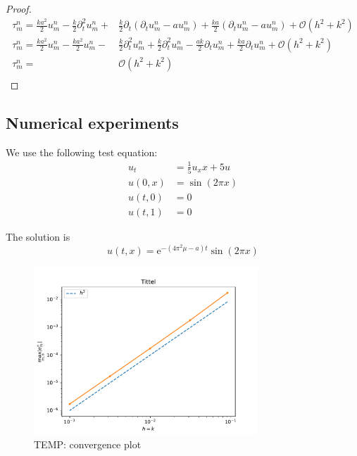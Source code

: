 \begin{proof}
    \begin{align*}
        \tau_m^n = \frac{ka^2}{2}u_{m}^{n}  - \frac{k}{2} \partial_t^2 u_{m}^{n} +& \frac{k}{2} \partial_t \left(\partial_t u_{m}^{n}   - au_{m}^{n} \right) + \frac{ka}{2} \left( \partial_t  u_{m}^{n} - a u_{m}^{n}\right)+ \mathcal{O}(h^2 + k^2) \\
        \tau_m^n = \frac{ka^2}{2}u_{m}^{n} - \frac{ka^2}{2}u_{m}^{n}  -& \frac{k}{2} \partial_t^2 u_{m}^{n} + \frac{k}{2} \partial_t^2 u_{m}^{n} - \frac{ak}{2} \partial_t u_{m}^{n} + \frac{ka}{2} \partial_t  u_{m}^{n}+ \mathcal{O}(h^2 + k^2) \\
        \tau_m^n =& \mathcal{O}(h^2 + k^2) \\
    \end{align*}
\end{proof}

\subsection{Numerical experiments}

We use the following test equation:
\begin{align}
  u_t &= \frac{1}{5}u_xx + 5 u \\
  u(0, x) &= \sin (2\pi x) \\
  u(t, 0) &= 0 \\
  u(t, 1) &= 0
\end{align}

The solution is
\begin{equation}
  \label{eq:anal_sol}
  u(t, x) = \text{e}^{-(4\pi^2 \mu - a)t}\sin(2\pi x)
\end{equation}

\begin{figure}[h]
    \centering
    \includegraphics[width=0.75\textwidth]{Images/plots/temp_task1.pdf}
    \caption{TEMP: convergence plot}
    \label{fig:mesh1}
\end{figure}
